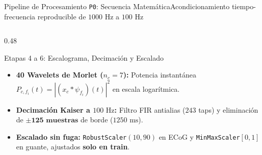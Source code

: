 \begin{frame}{Pipeline de Procesamiento \texttt{P0}: Secuencia Matem\'atica}{Acondicionamiento tiempo-frecuencia reproducible de $1000\text{ Hz}$ a $100\text{ Hz}$ \cite{kaplan2019decoding,rodas_valencia_tpe_ecog}}
\begin{columns}[T,onlytextwidth]
    \begin{column}{0.48\textwidth}
      \begin{block}{Etapas 4 a 6: Escalograma, Decimaci\'on y Escalado}
        \scriptsize
        \begin{itemize}\setlength{\itemsep}{3pt}
          \item \textbf{40 Wavelets de Morlet ($n_c=7$):} Potencia instant\'anea $P_{c,f_i}(t) = |(x_c * \psi_{f_i})(t)|^2$ en escala logar\'itmica.
          \item \textbf{Decimaci\'on Kaiser a $100\text{ Hz}$:} Filtro FIR antialias ($243$ taps) y eliminaci\'on de $\mathbf{\pm 125\text{ muestras}}$ de borde ($1250\text{ ms}$).
          \item \textbf{Escalado sin fuga:} \texttt{RobustScaler}$(10,90)$ en ECoG y \texttt{MinMaxScaler}$[0,1]$ en guante, ajustados \textbf{solo en train}.
        \end{itemize}
      \end{block}
    \end{column}
  \end{columns}
\end{frame}


